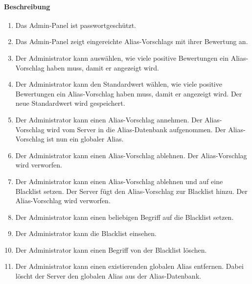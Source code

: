 \paragraph{Beschreibung}
\begin{enumerate}[start=101, label=\textbf{/FA\arabic*/}, align=left]
    \item Das \Gls{Admin-Panel} ist passwortgeschützt.
    \item Das \Gls{Admin-Panel} zeigt eingereichte \Glspl{Alias-Vorschlag} mit ihrer Bewertung an.
    \item Der \Gls{Administrator} kann auswählen, wie viele positive Bewertungen ein \Gls{Alias-Vorschlag} haben muss, damit er angezeigt wird.
    \item Der \Gls{Administrator} kann den Standardwert wählen, wie viele positive Bewertungen ein \Gls{Alias-Vorschlag} haben muss, damit er angezeigt wird. Der neue Standardwert wird gespeichert.
    \item Der \Gls{Administrator} kann einen \Gls{Alias-Vorschlag} annehmen. Der \Gls{Alias-Vorschlag} wird vom \Gls{Server} in die \Gls{Alias}-\Gls{Datenbank} aufgenommen. Der \Gls{Alias-Vorschlag} ist nun ein \gls{global}er \Gls{Alias}.
    \item Der \Gls{Administrator} kann einen \Gls{Alias-Vorschlag} ablehnen. Der \Gls{Alias-Vorschlag} wird verworfen.
    \item Der \Gls{Administrator} kann einen \Gls{Alias-Vorschlag} ablehnen und auf eine \Gls{Blacklist} setzen. Der \Gls{Server} fügt den {Alias-Vorschlag} zur \Gls{Blacklist} hinzu. Der \Gls{Alias-Vorschlag} wird verworfen.
    \item Der \Gls{Administrator} kann einen beliebigen Begriff auf die \Gls{Blacklist} setzen.
    \item Der \Gls{Administrator} kann die \Gls{Blacklist} einsehen.
    \item Der \Gls{Administrator} kann einen Begriff von der \Gls{Blacklist} löschen.
    \item Der \Gls{Administrator} kann einen existierenden \gls{global}en \Gls{Alias} entfernen. Dabei löscht der \Gls{Server} den \gls{global}en \Gls{Alias} aus der \Gls{Alias}-\Gls{Datenbank}.
\end{enumerate}